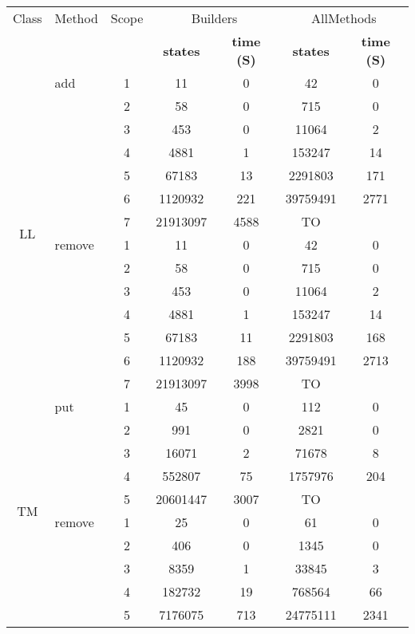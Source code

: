 \table{}
\scriptsize
\begin{tabular}{ c| l| c c c c c}
\hline
Class & Method & Scope &
\multicolumn{2}{c}{\textsf{Builders}} &
\multicolumn{2}{c}{\textsf{AllMethods}} \\
&&&
\tiny{\textbf{states}} & \tiny{\textbf{time (S)}} &
\tiny{\textbf{states}} & \tiny{\textbf{time (S)} }\\
\hline
\multirow{14}{*}{LL} 
& add
  & 1 & 11  & 0 & 42  & 0 \\
& & 2 & 58  & 0 & 715 & 0 \\
& & 3 & 453 & 0 & 11064 & 2 \\
& & 4 & 4881  & 1 & 153247  & 14  \\
& & 5 & 67183 & 13  & 2291803 & 171 \\
& & 6 & 1120932 & 221 & 39759491  & 2771  \\
& & 7 & 21913097  & 4588  &TO  & \\

\cline{2-7}
 &remove 
  & 1 & 11  & 0 & 42  & 0 \\
& & 2 & 58  & 0 & 715 & 0 \\
& & 3 & 453 & 0 & 11064 & 2\\
& & 4 & 4881  & 1 & 153247  & 14\\
& & 5 & 67183 & 11  & 2291803 & 168\\
& & 6 & 1120932 & 188 & 39759491  & 2713\\
& & 7 & 21913097  & 3998  & TO \\ 

\hline
\multirow{10}{*}{TM} 
& put
  & 1 & 45  & 0 & 112 & 0 \\
& & 2 & 991 & 0 & 2821  & 0 \\
& & 3 & 16071 & 2 & 71678 & 8 \\
& & 4 & 552807  & 75  & 1757976 & 204 \\
& & 5 & 20601447  & 3007  & TO& \\
\cline{2-7}

& remove
  & 1 & 25  & 0 & 61  & 0 \\
& & 2 & 406 & 0 & 1345  & 0 \\
& & 3 & 8359  & 1 & 33845 & 3 \\
& & 4 & 182732  & 19  & 768564  & 66  \\
& & 5 & 7176075 & 713 & 24775111  & 2341  \\






\end{tabular}
